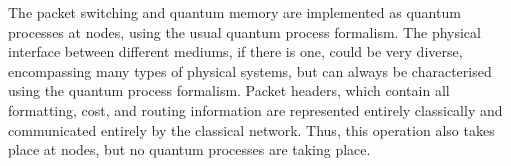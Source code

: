 The packet switching and quantum memory are implemented as quantum processes at nodes, using the usual quantum process formalism. The physical interface between different mediums, if there is one, could be very diverse, encompassing many types of physical systems, but can always be characterised using the quantum process formalism. Packet headers, which contain all formatting, cost, and routing information are represented entirely classically and communicated entirely by the classical network. Thus, this operation also takes place at nodes, but no quantum processes are taking place.

